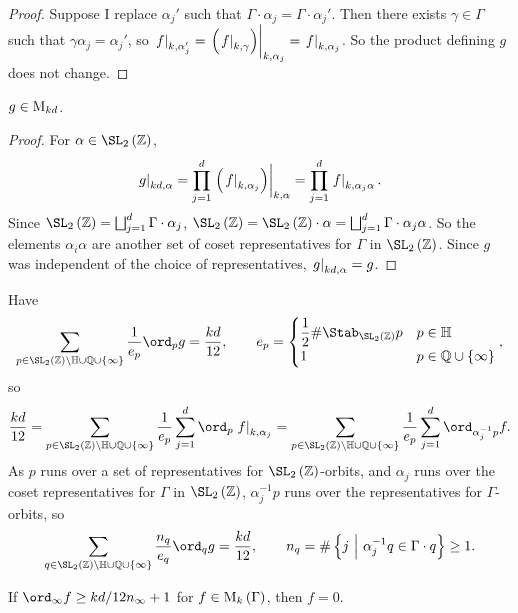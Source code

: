 \begin{proof}
Suppose I replace $ \alpha_j' $ such that $ \Gamma \cdot \alpha_j = \Gamma \cdot \alpha_j' $. Then there exists $ \gamma \in \Gamma $ such that $ \gamma\alpha_j = \alpha_j' $, so $ \eval{f}_{k, \alpha_j'} = \eval{\br{\eval{f}_{k, \gamma}}}_{k, \alpha_j} = \eval{f}_{k, \alpha_j} $. So the product defining $ g $ does not change.
\end{proof}

\begin{proposition}
$ g \in \mathrm{M}_{kd} $.
\end{proposition}

\begin{proof}
For $ \alpha \in \SL_2\br{\ZZ} $,
$$ \eval{g}_{kd, \alpha} = \prod_{j = 1}^d \eval{\br{\eval{f}_{k, \alpha_j}}}_{k, \alpha} = \prod_{j = 1}^d \eval{f}_{k, \alpha_j\alpha}. $$
Since $ \SL_2\br{\ZZ} = \bigsqcup_{j = 1}^d \Gamma \cdot \alpha_j $, $ \SL_2\br{\ZZ} = \SL_2\br{\ZZ} \cdot \alpha = \bigsqcup_{j = 1}^d \Gamma \cdot \alpha_j\alpha $. So the elements $ \alpha_i\alpha $ are another set of coset representatives for $ \Gamma $ in $ \SL_2\br{\ZZ} $. Since $ g $ was independent of the choice of representatives, $ \left. g \right|_{kd, \alpha} = g $.
\end{proof}

Have
$$ \sum_{p \in \SL_2\br{\ZZ} \backslash \HH \cup \QQ \cup \cbr{\infty}} \dfrac{1}{e_p}\ord_p g = \dfrac{kd}{12}, \qquad e_p =
\begin{cases}
\dfrac{1}{2}\#\Stab_{\SL_2\br{\ZZ}} p & p \in \HH \\
1 & p \in \QQ \cup \cbr{\infty}
\end{cases},
$$
so
$$ \dfrac{kd}{12} = \sum_{p \in \SL_2\br{\ZZ} \backslash \HH \cup \QQ \cup \cbr{\infty}} \dfrac{1}{e_p}\sum_{j = 1}^d \ord_p \eval{f}_{k, \alpha_j} = \sum_{p \in \SL_2\br{\ZZ} \backslash \HH \cup \QQ \cup \cbr{\infty}} \dfrac{1}{e_p}\sum_{j = 1}^d \ord_{\alpha_j^{-1}p} f. $$
As $ p $ runs over a set of representatives for $ \SL_2\br{\ZZ} $-orbits, and $ \alpha_j $ runs over the coset representatives for $ \Gamma $ in $ \SL_2\br{\ZZ} $, $ \alpha_j^{-1}p $ runs over the representatives for $ \Gamma $-orbits, so
$$ \sum_{q \in \SL_2\br{\ZZ} \backslash \HH \cup \QQ \cup \cbr{\infty}} \dfrac{n_q}{e_q}\ord_q g = \dfrac{kd}{12}, \qquad n_q = \#\cbr{j \st \alpha_j^{-1}q \in \Gamma \cdot q} \ge 1. $$

\begin{corollary}
If $ \ord_\infty f \ge kd / 12n_\infty + 1 $ for $ f \in \M_k\br{\Gamma} $, then $ f = 0 $.
\end{corollary}

